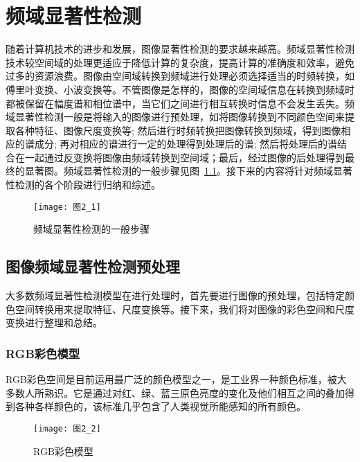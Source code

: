 

\chapter{频域显著性检测}
\label{cha2}

随着计算机技术的进步和发展，图像显著性检测的要求越来越高。频域显著性检测技术较空间域的处理更适应于降低计算的复杂度，提高计算的准确度和效率，避免过多的资源浪费。图像由空间域转换到频域进行处理必须选择适当的时频转换，如傅里叶变换、小波变换等。不管图像是怎样的，图像的空间域信息在转换到频域时都被保留在幅度谱和相位谱中，当它们之间进行相互转换时信息不会发生丢失。频域显著性检测一般是将输入的图像进行预处理，如将图像转换到不同颜色空间来提取各种特征、图像尺度变换等; 然后进行时频转换把图像转换到频域，得到图像相应的谱成分; 再对相应的谱进行一定的处理得到处理后的谱; 然后将处理后的谱结合在一起通过反变换将图像由频域转换到空间域；最后，经过图像的后处理得到最终的显著图。频域显著性检测的一般步骤见图~\ref{图2_1}。接下来的内容将针对频域显著性检测的各个阶段进行归纳和综述。

\begin{figure}[h]
  \centering
  \texttt{[image: 图2\_1]}
  \caption{频域显著性检测的一般步骤}
  \label{图2_1}    
\end{figure}

\section{图像频域显著性检测预处理}
\label{2_1}

大多数频域显著性检测模型在进行处理时，首先要进行图像的预处理，包括特定颜色空间转换用来提取特征、尺度变换等。接下来，我们将对图像的彩色空间和尺度变换进行整理和总结。

\subsection{RGB彩色模型}
\label{2_1_1}

RGB彩色空间是目前运用最广泛的颜色模型之一，是工业界一种颜色标准，被大多数人所熟识。它是通过对红、绿、蓝三原色亮度的变化及他们相互之间的叠加得到各种各样颜色的，该标准几乎包含了人类视觉所能感知的所有颜色。

\begin{figure}[t]
  \centering
  \texttt{[image: 图2\_2]}
  \caption{RGB彩色模型}
  \label{图2_2}    
\end{figure}

